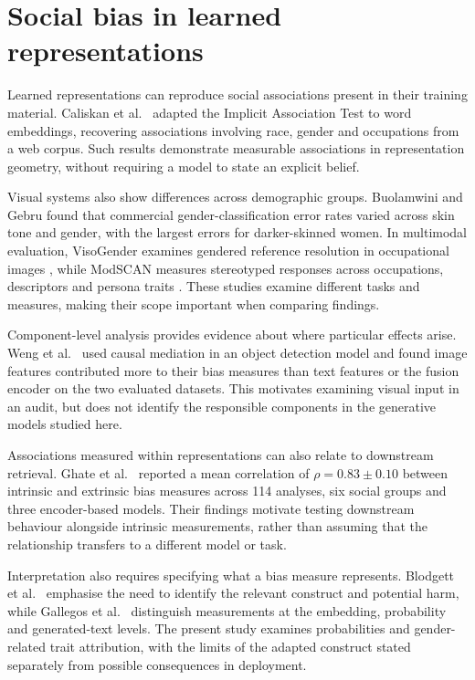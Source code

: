 \section{Social bias in learned representations}\label{sec:bg-bias}

Learned representations can reproduce social associations present in their
training material. Caliskan et al.\ \cite{caliskan2017semantics} adapted
the Implicit Association Test \cite{greenwald1998iat} to word embeddings,
recovering associations involving race, gender and occupations from a web
corpus. Such results demonstrate measurable associations in representation
geometry, without requiring a model to state an explicit belief.

Visual systems also show differences across demographic groups.
Buolamwini and Gebru \cite{buolamwini2018gender} found that commercial
gender-classification error rates varied across skin tone and gender,
with the largest errors for darker-skinned women. In multimodal evaluation,
VisoGender examines gendered reference resolution in occupational images
\cite{hall2023visogender}, while ModSCAN measures stereotyped responses
across occupations, descriptors and persona traits
\cite{jiang2024modscan}. These studies examine different tasks and
measures, making their scope important when comparing findings.

Component-level analysis provides evidence about where particular effects
arise. Weng et al.\ \cite{weng2024images} used causal mediation in an
object detection model and found image features contributed more to their
bias measures than text features or the fusion encoder on the two evaluated
datasets. This motivates examining visual input in an audit, but does not
identify the responsible components in the generative models studied here.

Associations measured within representations can also relate to downstream
retrieval. Ghate et al.\ \cite{ghate2025biases} reported a mean correlation
of $\rho=0.83\pm0.10$ between intrinsic and extrinsic bias measures across
114 analyses, six social groups and three encoder-based models.
Their findings motivate testing downstream behaviour alongside intrinsic
measurements, rather than assuming that the relationship transfers to a
different model or task.

Interpretation also requires specifying what a bias measure represents.
Blodgett et al.\ \cite{blodgett2020language} emphasise the need to identify
the relevant construct and potential harm, while Gallegos et al.\
\cite{gallegos2024bias} distinguish measurements at the embedding,
probability and generated-text levels. The present study examines
probabilities and gender-related trait attribution, with the limits of the
adapted construct stated separately from possible consequences in deployment.

